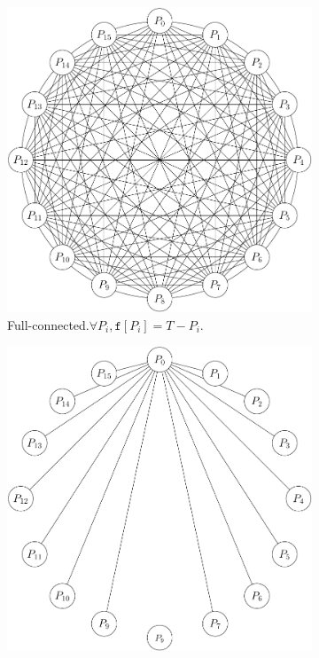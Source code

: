 \documentclass{article}
\begin{document}
\pagestyle{empty}

\begin{figure}
  \centering
  \begin{subfigure}[t]{0.3\textwidth}
    \centering
    \includegraphics[width=\textwidth]{full-mesh}
    \caption{Full-connected.\newline $\forall P_i, \mathtt{f}[P_i]=T-P_i$.}
    \label{fig:full}
  \end{subfigure}
  \hfill
  \begin{subfigure}[t]{0.3\textwidth}
    \centering
    \includegraphics[width=\textwidth]{star}

\end{subfigure}
\end{figure}
\end{document}
